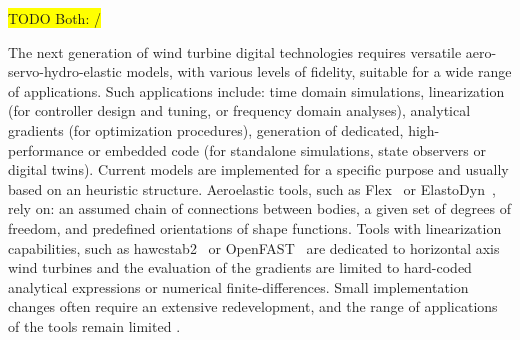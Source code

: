 \documentclass[wes, manuscript]{copernicus}
\renewcommand{\v}[1]{\boldsymbol{#1}}
\newcommand{\todoBoth}    [1]{{\colorbox{yellow}{TODO Both:    }}{\color{red}{#1}}\colorbox{yellow}{/}}
\begin{document}


\introduction 
\todoBoth{Mention that this is not state of the art. Mention geometrically exact theory with reference. Mention generalized multibody framework with reference.}

The next generation of wind turbine digital technologies requires versatile aero-servo-hydro-elastic
models, with various levels of fidelity, suitable for a wide range of applications. 
Such applications include: time domain simulations, linearization (for controller design and tuning, or frequency domain analyses), analytical gradients (for optimization procedures), generation of dedicated, high-performance or embedded code (for standalone simulations, state observers or digital twins). 
Current models are implemented for a specific purpose and usually based on an heuristic structure.
Aeroelastic tools, such as Flex~\citep{flexoye,branlard:2019flex} or ElastoDyn~\citep{openfast}, rely on: an assumed chain of connections between bodies, a given set of degrees of freedom, and predefined orientations of shape functions. 
Tools with linearization capabilities, such as hawcstab2~\citep{Sonderby:2014} or OpenFAST~\citep{openfast} are dedicated to horizontal axis wind turbines and the evaluation of the gradients are limited to hard-coded analytical expressions or numerical finite-differences. 
Small implementation changes often require an extensive redevelopment, and the range of applications of the tools remain limited \citep{Simani:2015}.
\end{document}
